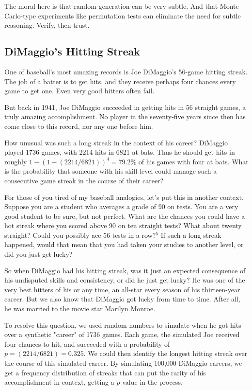 \documentclass[10pt]{article}
\begin{document}
The moral here is that random generation can be very subtle. And that Monte Carlo-type experiments like permutation tests can eliminate the need for subtle reasoning. Verify, then trust.

\subsection{DiMaggio's Hitting Streak}
One of baseball's most amazing records is Joe DiMaggio's 56-game hitting streak. The job of a batter is to get hits, and they receive perhaps four chances every game to get one. Even very good hitters often fail.

But back in 1941, Joe DiMaggio succeeded in getting hits in 56 straight games, a truly amazing accomplishment. No player in the seventy-five years since then has come close to this record, nor any one before him.

How unusual was such a long streak in the context of his career? DiMaggio played 1736 games, with 2214 hits in 6821 at bats. Thus he should get hits in roughly $1-(1-(2214 / 6821))^{4}=79.2\%$ of his games with four at bats. What is the probability that someone with his skill level could manage such a consecutive game streak in the course of their career?

For those of you tired of my baseball analogies, let's put this in another context. Suppose you are a student who averages a grade of 90 on tests. You are a very good student to be sure, but not perfect. What are the chances you could have a hot streak where you scored above 90 on ten straight tests? What about twenty straight? Could you possibly ace 56 tests in a row?${}^5$ If such a long streak happened, would that mean that you had taken your studies to another level, or did you just get lucky?

So when DiMaggio had his hitting streak, was it just an expected consequence of his undisputed skills and consistency, or did he just get lucky? He was one of the very best hitters of his or any time, an all-star every season of his thirteen-year career. But we also know that DiMaggio got lucky from time to time. After all, he was married to the movie star Marilyn Monroe.

To resolve this question, we used random numbers to simulate when he got hits over a synthetic "career" of 1736 games. Each game, the simulated Joe received four chances to hit, and succeeded with a probability of $p=(2214 / 6821)=0.325$. We could then identify the longest hitting streak over the course of this simulated career. By simulating 100,000 DiMaggio careers, we get a frequency distribution of streaks that can put the rarity of his accomplishment in context, getting a $p$-value in the process.
\end{document}
